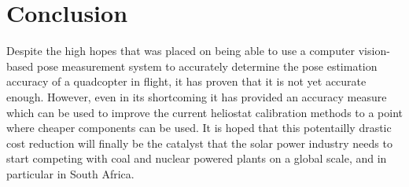 \section{Conclusion}

Despite the high hopes that was placed on being able to use a computer vision-based pose measurement system to accurately determine the pose estimation accuracy of a quadcopter in flight, it has proven that it is not yet accurate enough. However, even in its shortcoming it has provided an accuracy measure which can be used to improve the current heliostat calibration methods to a point where cheaper components can be used. It is hoped that this potentailly drastic cost reduction will finally be the catalyst that the solar power industry needs to start competing with coal and nuclear powered plants on a global scale, and in particular in South Africa. 
